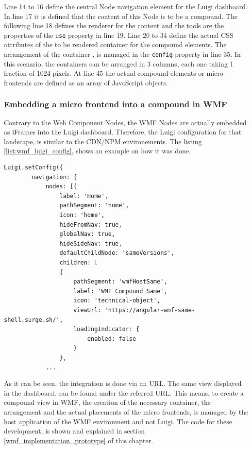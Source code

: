 Line 14 to 16 define the central Node navigation element for the Luigi dashboard. In line 17 it is defined that the content of this Node is to be a compound. The following line 18 defines the renderer for the content and the tools are the properties of the \texttt{use} property in line 19. Line 20 to 34 define the actual CSS attributes of the to be rendered container for the compound elements. The arrangement of the container , is managed in the \texttt{config} property in line 35. In this scenario, the containers can be arranged in 3 columns, each one taking 1 fraction of 1024 pixels.
At line 45 the actual compound elements or micro frontends are defined as an array of JavaScript objects.

\subsubsection{Embedding a micro frontend into a compound in WMF}
\label{embedd_mfe_in_wmf}

Contrary to the Web Component Nodes, the WMF Nodes are actually embedded as iFrames into the Luigi dashboard. Therefore, the Luigi configuration for that landscape, is similar to the CDN/NPM environements. The listing \ref{list:wmf_luigi_config}, shows an example on how it was done.

\begin{lstlisting}[caption=Example configuration to embed a WMF micro frontend compound as a Node in Luigi, label=list:wmf_luigi_config,  xleftmargin=.0\textwidth, xrightmargin=.0\textwidth]
	Luigi.setConfig({
		navigation: {
			nodes: [{
				label: 'Home',
				pathSegment: 'home',
				icon: 'home',
				hideFromNav: true,
				globalNav: true,
				hideSideNav: true,
				defaultChildNode: 'sameVersions',
				children: [
                {
					pathSegment: 'wmfHostSame',
					label: 'WMF Compound Same',
					icon: 'technical-object',
					viewUrl: 'https://angular-wmf-same-shell.surge.sh/',
					loadingIndicator: {
						enabled: false
					}
				},
			...
\end{lstlisting}

As it can be seen, the integration is done via an URL. The same view displayed in the dashboard, can be found under the referred URL. This means, to create a compound view in WMF, the creation of the necessary container, the arrangement and the actual placements of the micro frontends, is managed by the host application of the WMF environment and not Luigi.
The code for these development, is shown and explained in section \ref{wmf_implementation_prototype} of this chapter.

